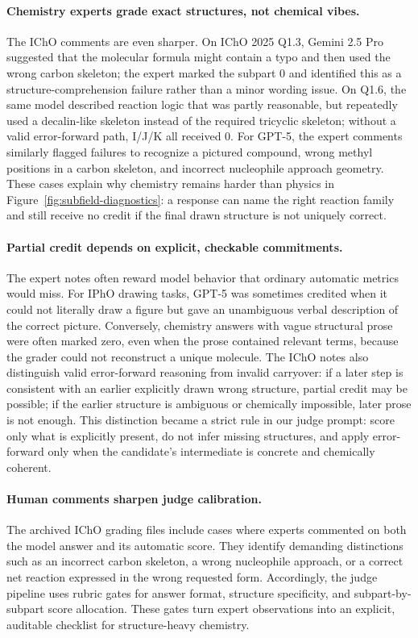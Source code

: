 \documentclass[11pt]{article}
\begin{document}
\paragraph{Chemistry experts grade exact structures, not chemical vibes.}
The IChO comments are even sharper.
On IChO 2025 Q1.3, Gemini 2.5 Pro suggested that the molecular formula might contain a typo and then used the wrong carbon skeleton; the expert marked the subpart 0 and identified this as a structure-comprehension failure rather than a minor wording issue.
On Q1.6, the same model described reaction logic that was partly reasonable, but repeatedly used a decalin-like skeleton instead of the required tricyclic skeleton; without a valid error-forward path, I/J/K all received 0.
For GPT-5, the expert comments similarly flagged failures to recognize a pictured compound, wrong methyl positions in a carbon skeleton, and incorrect nucleophile approach geometry.
These cases explain why chemistry remains harder than physics in Figure~\ref{fig:subfield-diagnostics}: a response can name the right reaction family and still receive no credit if the final drawn structure is not uniquely correct.

\paragraph{Partial credit depends on explicit, checkable commitments.}
The expert notes often reward model behavior that ordinary automatic metrics would miss.
For IPhO drawing tasks, GPT-5 was sometimes credited when it could not literally draw a figure but gave an unambiguous verbal description of the correct picture.
Conversely, chemistry answers with vague structural prose were often marked zero, even when the prose contained relevant terms, because the grader could not reconstruct a unique molecule.
The IChO notes also distinguish valid error-forward reasoning from invalid carryover: if a later step is consistent with an earlier explicitly drawn wrong structure, partial credit may be possible; if the earlier structure is ambiguous or chemically impossible, later prose is not enough.
This distinction became a strict rule in our judge prompt: score only what is explicitly present, do not infer missing structures, and apply error-forward only when the candidate's intermediate is concrete and chemically coherent.

\paragraph{Human comments sharpen judge calibration.}
The archived IChO grading files include cases where experts commented on both the model answer and its automatic score.
They identify demanding distinctions such as an incorrect carbon skeleton, a wrong nucleophile approach, or a correct net reaction expressed in the wrong requested form.
Accordingly, the judge pipeline uses rubric gates for answer format, structure specificity, and subpart-by-subpart score allocation.
These gates turn expert observations into an explicit, auditable checklist for structure-heavy chemistry.
\end{document}
